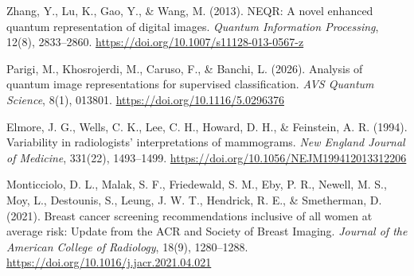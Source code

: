     Zhang, Y., Lu, K., Gao, Y., \& Wang, M. (2013).
    NEQR: A novel enhanced quantum representation of digital images.
    \textit{Quantum Information Processing}, 12(8), 2833--2860.
    \url{https://doi.org/10.1007/s11128-013-0567-z}

    Parigi, M., Khosrojerdi, M., Caruso, F., \& Banchi, L. (2026).
    Analysis of quantum image representations for supervised classification.
    \textit{AVS Quantum Science}, 8(1), 013801.
    \url{https://doi.org/10.1116/5.0296376}


    Elmore, J. G., Wells, C. K., Lee, C. H., Howard, D. H., \& Feinstein, A. R. (1994).
    Variability in radiologists' interpretations of mammograms.
    \textit{New England Journal of Medicine}, 331(22), 1493--1499.
    \url{https://doi.org/10.1056/NEJM199412013312206}

    Monticciolo, D. L., Malak, S. F., Friedewald, S. M., Eby, P. R., Newell, M. S., Moy, L.,
    Destounis, S., Leung, J. W. T., Hendrick, R. E., \& Smetherman, D. (2021).
    Breast cancer screening recommendations inclusive of all women at average risk: Update from the ACR and Society of Breast Imaging.
    \textit{Journal of the American College of Radiology}, 18(9), 1280--1288.
    \url{https://doi.org/10.1016/j.jacr.2021.04.021}

